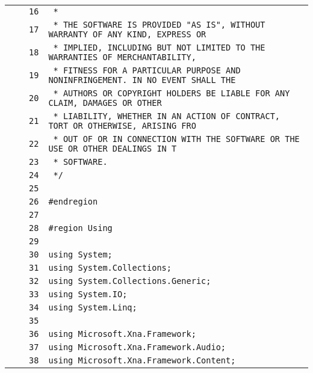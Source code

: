 \documentclass[a4paper,10pt]{article}
\begin{document}
\begin{longtable}[l]{lrrl}
\cellcolor{gray} &  & \verb~16~ & \verb~ *~\\
\cellcolor{gray} &  & \verb~17~ & \verb~ * THE SOFTWARE IS PROVIDED "AS IS", WITHOUT WARRANTY OF ANY KIND, EXPRESS OR~\\
\cellcolor{gray} &  & \verb~18~ & \verb~ * IMPLIED, INCLUDING BUT NOT LIMITED TO THE WARRANTIES OF MERCHANTABILITY,~\\
\cellcolor{gray} &  & \verb~19~ & \verb~ * FITNESS FOR A PARTICULAR PURPOSE AND NONINFRINGEMENT. IN NO EVENT SHALL THE~\\
\cellcolor{gray} &  & \verb~20~ & \verb~ * AUTHORS OR COPYRIGHT HOLDERS BE LIABLE FOR ANY CLAIM, DAMAGES OR OTHER~\\
\cellcolor{gray} &  & \verb~21~ & \verb~ * LIABILITY, WHETHER IN AN ACTION OF CONTRACT, TORT OR OTHERWISE, ARISING FRO~\\
\cellcolor{gray} &  & \verb~22~ & \verb~ * OUT OF OR IN CONNECTION WITH THE SOFTWARE OR THE USE OR OTHER DEALINGS IN T~\\
\cellcolor{gray} &  & \verb~23~ & \verb~ * SOFTWARE.~\\
\cellcolor{gray} &  & \verb~24~ & \verb~ */~\\
\cellcolor{gray} &  & \verb~25~ & \verb~~\\
\cellcolor{gray} &  & \verb~26~ & \verb~#endregion~\\
\cellcolor{gray} &  & \verb~27~ & \verb~~\\
\cellcolor{gray} &  & \verb~28~ & \verb~#region Using~\\
\cellcolor{gray} &  & \verb~29~ & \verb~~\\
\cellcolor{gray} &  & \verb~30~ & \verb~using System;~\\
\cellcolor{gray} &  & \verb~31~ & \verb~using System.Collections;~\\
\cellcolor{gray} &  & \verb~32~ & \verb~using System.Collections.Generic;~\\
\cellcolor{gray} &  & \verb~33~ & \verb~using System.IO;~\\
\cellcolor{gray} &  & \verb~34~ & \verb~using System.Linq;~\\
\cellcolor{gray} &  & \verb~35~ & \verb~~\\
\cellcolor{gray} &  & \verb~36~ & \verb~using Microsoft.Xna.Framework;~\\
\cellcolor{gray} &  & \verb~37~ & \verb~using Microsoft.Xna.Framework.Audio;~\\
\cellcolor{gray} &  & \verb~38~ & \verb~using Microsoft.Xna.Framework.Content;~\\

\end{longtable}
\end{document}
